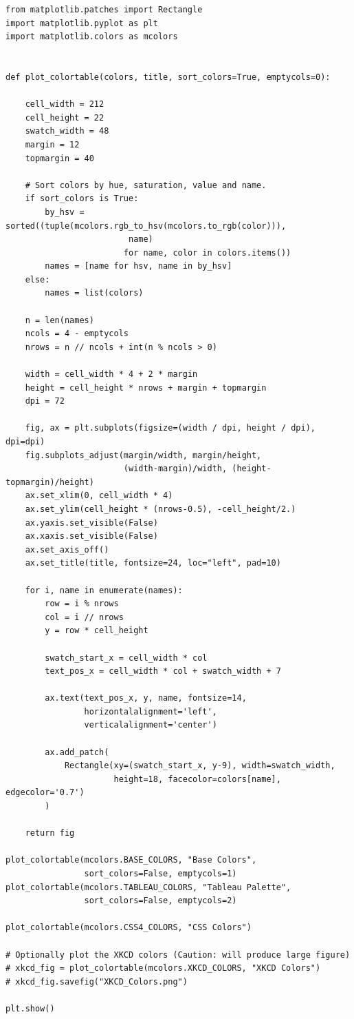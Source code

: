 \documentclass[
  oneside]{book}
\begin{document}
\begin{verbatim}
from matplotlib.patches import Rectangle
import matplotlib.pyplot as plt
import matplotlib.colors as mcolors


def plot_colortable(colors, title, sort_colors=True, emptycols=0):

    cell_width = 212
    cell_height = 22
    swatch_width = 48
    margin = 12
    topmargin = 40

    # Sort colors by hue, saturation, value and name.
    if sort_colors is True:
        by_hsv = sorted((tuple(mcolors.rgb_to_hsv(mcolors.to_rgb(color))),
                         name)
                        for name, color in colors.items())
        names = [name for hsv, name in by_hsv]
    else:
        names = list(colors)

    n = len(names)
    ncols = 4 - emptycols
    nrows = n // ncols + int(n % ncols > 0)

    width = cell_width * 4 + 2 * margin
    height = cell_height * nrows + margin + topmargin
    dpi = 72

    fig, ax = plt.subplots(figsize=(width / dpi, height / dpi), dpi=dpi)
    fig.subplots_adjust(margin/width, margin/height,
                        (width-margin)/width, (height-topmargin)/height)
    ax.set_xlim(0, cell_width * 4)
    ax.set_ylim(cell_height * (nrows-0.5), -cell_height/2.)
    ax.yaxis.set_visible(False)
    ax.xaxis.set_visible(False)
    ax.set_axis_off()
    ax.set_title(title, fontsize=24, loc="left", pad=10)

    for i, name in enumerate(names):
        row = i % nrows
        col = i // nrows
        y = row * cell_height

        swatch_start_x = cell_width * col
        text_pos_x = cell_width * col + swatch_width + 7

        ax.text(text_pos_x, y, name, fontsize=14,
                horizontalalignment='left',
                verticalalignment='center')

        ax.add_patch(
            Rectangle(xy=(swatch_start_x, y-9), width=swatch_width,
                      height=18, facecolor=colors[name], edgecolor='0.7')
        )

    return fig

plot_colortable(mcolors.BASE_COLORS, "Base Colors",
                sort_colors=False, emptycols=1)
plot_colortable(mcolors.TABLEAU_COLORS, "Tableau Palette",
                sort_colors=False, emptycols=2)

plot_colortable(mcolors.CSS4_COLORS, "CSS Colors")

# Optionally plot the XKCD colors (Caution: will produce large figure)
# xkcd_fig = plot_colortable(mcolors.XKCD_COLORS, "XKCD Colors")
# xkcd_fig.savefig("XKCD_Colors.png")

plt.show()
\end{verbatim}
\end{document}
